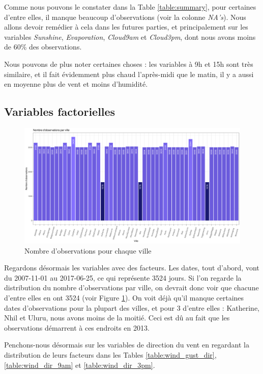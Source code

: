 \documentclass{article}
\begin{document}
Comme nous pouvons le constater dans la Table \ref{table:summary}, pour certaines d'entre elles, il manque beaucoup d'observations (voir la colonne \emph{NA's}). Nous allons devoir remédier à cela dans les futures parties, et principalement sur les variables \emph{Sunshine}, \emph{Evaporation}, \emph{Cloud9am} et \emph{Cloud3pm}, dont nous avons moins de 60\% des observations.

Nous pouvons de plus noter certaines choses : les variables à 9h et 15h sont très similaire, et il fait évidemment plus chaud l'après-midi que le matin, il y a aussi en moyenne plus de vent et moins d'humidité. 

\subsection{Variables factorielles}

\begin{figure}[htp]
    \centering
    \includegraphics[width=\textwidth]{Images/hist_observations_cities.pdf}
    \caption{Nombre d'observations pour chaque ville}
    \label{fig:obs_per_cities}
\end{figure}

Regardons désormais les variables avec des facteurs. Les dates, tout d'abord, vont du 2007-11-01 au 2017-06-25, ce qui représente 3524 jours. Si l'on regarde la distribution du nombre d'observations par ville, on devrait donc voir que chacune d'entre elles en ont 3524 (voir Figure \ref{fig:obs_per_cities}). On voit déjà qu'il manque certaines dates d'observations pour la plupart des villes, et pour 3 d'entre elles : Katherine, Nhil et Uluru, nous avons moins de la moitié. Ceci est dû au fait que les observations démarrent à ces endroits en 2013.

Penchons-nous désormais sur les variables de direction du vent en regardant la distribution de leurs facteurs dans les Tables \ref{table:wind_gust_dir}, \ref{table:wind_dir_9am} et \ref{table:wind_dir_3pm}.
\end{document}
